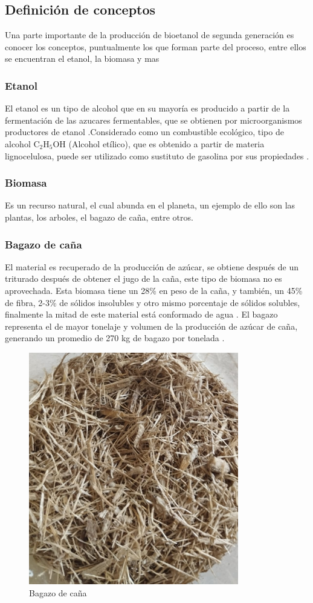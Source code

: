 \documentclass[12pt]{article}
\begin{document}
	\subsection{Definición de conceptos}
		
		
		
		Una parte  importante de la producción de bioetanol de segunda generación es conocer los conceptos, puntualmente los que forman parte del proceso, entre ellos se encuentran el etanol, la biomasa y mas 
		\subsubsection{Etanol}
		El etanol es un tipo de alcohol que en su mayoría es producido a partir de la  fermentación de las azucares fermentables, que se obtienen por microorganismos productores de etanol \cite{GONZALEZ2019Pretratamiento} .Considerado como un combustible ecológico, tipo de alcohol $\text{C}_2\text{H}_5\text{OH}$ (Alcohol etílico), que es obtenido a partir de materia lignocelulosa, puede ser utilizado como sustituto de gasolina por sus propiedades \cite{Ballesteros2002proceso}.
		
		\subsubsection{Biomasa}
	Es un recurso natural, el cual abunda en el planeta, un ejemplo de ello son las plantas, los arboles, el bagazo de caña, entre otros.
		
		\subsubsection{Bagazo de caña}
		El material es recuperado de la producción de azúcar, se obtiene después de un triturado después de obtener el jugo de la caña, este tipo de biomasa no es aprovechada. Esta biomasa tiene un 28\% en peso de la caña, y también, un 45\% de fibra, 2-3\% de sólidos insolubles y otro mismo porcentaje de sólidos solubles, finalmente la mitad de este material está conformado de agua \cite{olmo2015bagazo}.
		El bagazo representa el de mayor tonelaje y volumen de la producción de azúcar de caña, generando un promedio de 270 kg de bagazo por tonelada \cite{perez2022efecto}.
		
		\begin{figure}[h]
			\centering
			\includegraphics[width=0.4\linewidth]{imagenes/bagazo}
			\caption[Bagazo de caña]{Bagazo de caña}
			\label{fig:bagazo}
		\end{figure}
		
\end{document}
